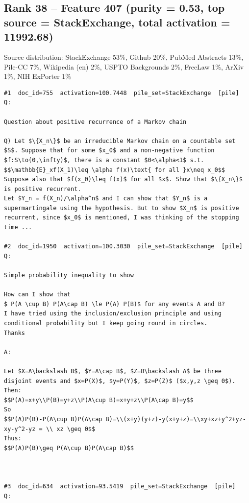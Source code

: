 \subsection*{Rank 38 -- Feature 407 (purity = 0.53, top source = StackExchange, total activation = 11992.68)}

Source distribution: StackExchange 53\%, Github 20\%, PubMed Abstracts 13\%, Pile-CC 7\%, Wikipedia (en) 2\%, USPTO Backgrounds 2\%, FreeLaw 1\%, ArXiv 1\%, NIH ExPorter 1\%

\begin{verbatim}
#1  doc_id=755  activation=100.7448  pile_set=StackExchange  [pile]
Q:

Question about positive recurrence of a Markov chain

Q) Let $\{X_n\}$ be an irreducible Markov chain on a countable set $S$. Suppose that for some $x_0$ and a non-negative function $f:S\to(0,\infty)$, there is a constant $0<\alpha<1$ s.t. 
$$\mathbb{E}_xf(X_1)\leq \alpha f(x)\text{ for all }x\neq x_0$$
Suppose also that $f(x_0)\leq f(x)$ for all $x$. Show that $\{X_n\}$ is positive recurrent.
Let $Y_n = f(X_n)/\alpha^n$ and I can show that $Y_n$ is a supermartingale using the hypothesis. But to show $X_n$ is positive recurrent, since $x_0$ is mentioned, I was thinking of the stopping time ...

#2  doc_id=1950  activation=100.3030  pile_set=StackExchange  [pile]
Q:

Simple probability inequality to show

How can I show that 
$ P(A \cup B) P(A\cap B) \le P(A) P(B)$ for any events A and B?
I have tried using the inclusion/exclusion principle and using conditional probability but I keep going round in circles.
Thanks

A:

Let $X=A\backslash B$, $Y=A\cap B$, $Z=B\backslash A$ be three disjoint events and $x=P(X)$, $y=P(Y)$, $z=P(Z)$ ($x,y,z \geq 0$). 
Then:
$$P(A)=x+y\\P(B)=y+z\\P(A\cup B)=x+y+z\\P(A\cap B)=y$$
So
$$P(A)P(B)-P(A\cup B)P(A\cap B)=\\(x+y)(y+z)-y(x+y+z)=\\xy+xz+y^2+yz-xy-y^2-yz = \\ xz \geq 0$$
Thus:
$$P(A)P(B)\geq P(A\cup B)P(A\cap B)$$



#3  doc_id=634  activation=93.5419  pile_set=StackExchange  [pile]
Q:


\end{verbatim}
